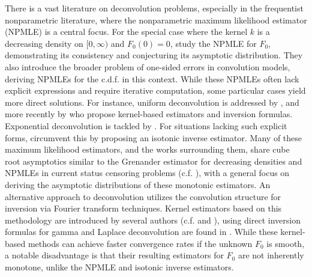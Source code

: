 There is a vast literature on deconvolution problems, especially in the frequentist nonparametric literature, where the nonparametric maximum likelihood estimator (NPMLE) is a central focus. For the special case where the kernel $k$ is a decreasing density on $[0, \infty)$ and $F_0(0) = 0$, \cite{71} study the NPMLE for $F_0$, demonstrating its consistency and conjecturing its asymptotic distribution. They also introduce the broader problem of one-sided errors in convolution models, deriving NPMLEs for the c.d.f. in this context. While these NPMLEs often lack explicit expressions and require iterative computation, some particular cases yield more direct solutions. For instance, uniform deconvolution is addressed by \cite{98, 99}, and more recently by \cite{75} who propose kernel-based estimators and inversion formulas. Exponential deconvolution is tackled by \cite{104, 73}. For situations lacking such explicit forms, \cite{74} circumvent this by proposing an isotonic inverse estimator. Many of these maximum likelihood estimators, and the works surrounding them, share cube root asymptotics similar to the Grenander estimator for decreasing densities and NPMLEs in current status censoring problems (c.f. \cite{2}), with a general focus on deriving the asymptotic distributions of these monotonic estimators. An alternative approach to deconvolution utilizes the convolution structure for inversion via Fourier transform techniques. Kernel estimators based on this methodology are introduced by several authors (c.f. \cite{84} and \cite{101}), using direct inversion formulas for gamma and Laplace deconvolution are found in \cite{102}. While these kernel-based methods can achieve faster convergence rates if the unknown $F_0$ is smooth, a notable disadvantage is that their resulting estimators for $F_0$ are not inherently monotone, unlike the NPMLE and isotonic inverse estimators.


